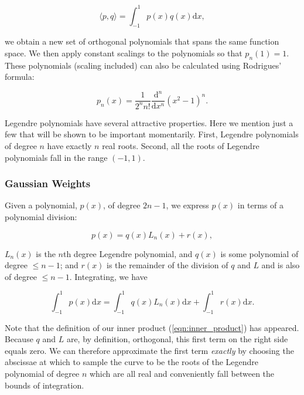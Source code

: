 \begin{equation}
    \label{eqn:inner_product}
    \langle p,q \rangle = \int^1_{-1} p(x) q(x) \mathrm{d}x,
\end{equation}

\noindent we obtain a new set of orthogonal polynomials that spans the same function space.
%
We then apply constant scalings to the polynomials so that \(p_n(1) = 1\).
%
These polynomials (scaling included) can also be calculated using Rodrigues' formula:

\begin{equation}
    p_n(x) = \frac{1}{2^n n!} \frac{\mathrm{d}^n}{\mathrm{d}x^n} \left(x^2 - 1 \right)^n.
\end{equation}

Legendre polynomials have several attractive properties.
%
Here we mention just a few that will be shown to be important momentarily.
%
First, Legendre polynomials of degree \(n\) have exactly \(n\) real roots.
%
Second, all the roots of Legendre polynomials fall in the range \((-1,1)\).

\subsubsection{Gaussian Weights}

Given a polynomial, \(p(x)\), of degree \(2n-1\), we express \(p(x)\) in terms of a polynomial division:

\begin{equation}
    p(x) = q(x) L_n(x) + r(x),
\end{equation}

\where \(L_n(x)\) is the \(n\)th degree Legendre polynomial, and \(q(x)\) is some polynomial of degree \(\leq n-1\); and \(r(x)\) is the remainder of the division of \(q\) and \(L\) and is also of degree \(\leq n-1\).
%
Integrating, we have

\begin{equation}
    \int_{-1}^{1} p(x) \mathrm{d}x = \int_{-1}^{1} q(x) L_n(x) \mathrm{d}x + \int_{-1}^{1} r(x) \mathrm{d}x.
\end{equation}

\noindent Note that the definition of our inner product (\cref{eqn:inner_product}) has appeared.
%
Because \(q\) and \(L\) are, by definition, orthogonal, this first term on the right side equals zero.
%
We can therefore approximate the first term \textit{exactly} by choosing the abscissae at which to sample the curve to be the roots of the Legendre polynomial of degree \(n\)  which are all real and conveniently fall between the bounds of integration.

